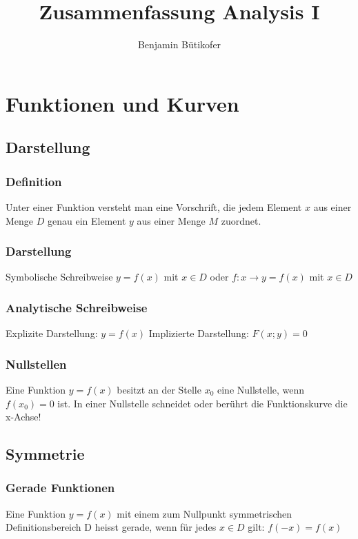 \documentclass[a4paper,DIV10,12pt,headsepline,smallheadings,halfparskip-]{scrreprt}
\title{Zusammenfassung Analysis I}
\author{Benjamin Bütikofer}
\begin{document}
	\maketitle
	\tableofcontents

	\chapter{Funktionen und Kurven}
	\section{Darstellung} %
	\label{sec:darstellung}

	\subsection{Definition}
	Unter einer Funktion versteht man eine Vorschrift, die jedem Element \(x\) aus einer Menge \(D\) genau ein Element \(y\) aus einer Menge \(M\) zuordnet.

	\subsection{Darstellung}
	Symbolische Schreibweise
	\newline \(y = f(x)\) mit \(x \in D\) oder
	\newline \(f: x \rightarrow y = f(x)\) mit \(x \in D\)

	\subsection{Analytische Schreibweise}
	Explizite Darstellung: \(y = f (x) \)
	\newline Implizierte Darstellung: \(F(x;y) = 0\)

	\subsection{Nullstellen} %
	\label{sec:nullstellen}
	Eine Funktion \(y = f(x)\) besitzt an der Stelle \(x_{0}\) eine Nullstelle, wenn \(f(x_{0}) = 0\) ist.
	\newline In einer Nullstelle schneidet oder berührt die Funktionskurve die x-Achse!

	\section{Symmetrie} %
	\subsection{Gerade Funktionen} %
	Eine Funktion \(y = f(x)\) mit einem zum Nullpunkt symmetrischen Definitionsbereich D heisst gerade, wenn für jedes \(x \in D\) gilt:
	\newline \(f(-x) = f(x)\)
\end{document}
